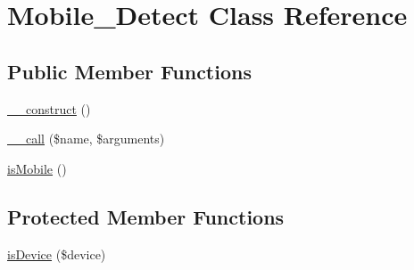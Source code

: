 \hypertarget{class_mobile___detect}{\section{\-Mobile\-\_\-\-Detect \-Class \-Reference}
\label{class_mobile___detect}
}
\subsection*{\-Public \-Member \-Functions}
\begin{DoxyCompactItemize}
\item 
\hyperlink{class_mobile___detect_a095c5d389db211932136b53f25f39685}{\-\_\-\-\_\-construct} ()
\item 
\hyperlink{class_mobile___detect_a3815af62ed9d37b2dcaa175379bbfeca}{\-\_\-\-\_\-call} (\$name, \$arguments)
\item 
\hyperlink{class_mobile___detect_aa03affe506ea70c6d04fab89fee473fc}{is\-Mobile} ()
\end{DoxyCompactItemize}
\subsection*{\-Protected \-Member \-Functions}
\begin{DoxyCompactItemize}
\item 
\hyperlink{class_mobile___detect_aa9e1e06bf2a4247c19be3c0f48da95ff}{is\-Device} (\$device)
\end{DoxyCompactItemize}
